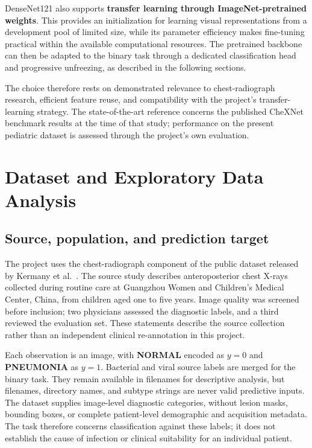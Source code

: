 \documentclass[12pt,letterpaper]{article}
\begin{document}
DenseNet121 also supports \textbf{transfer learning through ImageNet-pretrained weights}. This provides an initialization for learning visual representations from a development pool of limited size, while its parameter efficiency makes fine-tuning practical within the available computational resources. The pretrained backbone can then be adapted to the binary task through a dedicated classification head and progressive unfreezing, as described in the following sections.

The choice therefore rests on demonstrated relevance to chest-radiograph research, efficient feature reuse, and compatibility with the project's transfer-learning strategy. The state-of-the-art reference concerns the published CheXNet benchmark results at the time of that study; performance on the present pediatric dataset is assessed through the project's own evaluation.

\section{Dataset and Exploratory Data Analysis}
\label{sec:dataset}

\subsection{Source, population, and prediction target}
The project uses the chest-radiograph component of the public dataset released by Kermany et al.\ \cite{kermany2018,kermanydata}. The source study describes anteroposterior chest X-rays collected during routine care at Guangzhou Women and Children's Medical Center, China, from children aged one to five years. Image quality was screened before inclusion; two physicians assessed the diagnostic labels, and a third reviewed the evaluation set. These statements describe the source collection rather than an independent clinical re-annotation in this project.

Each observation is an image, with \textbf{NORMAL} encoded as $y=0$ and \textbf{PNEUMONIA} as $y=1$. Bacterial and viral source labels are merged for the binary task. They remain available in filenames for descriptive analysis, but filenames, directory names, and subtype strings are never valid predictive inputs. The dataset supplies image-level diagnostic categories, without lesion masks, bounding boxes, or complete patient-level demographic and acquisition metadata. The task therefore concerns classification against these labels; it does not establish the cause of infection or clinical suitability for an individual patient.
\end{document}
